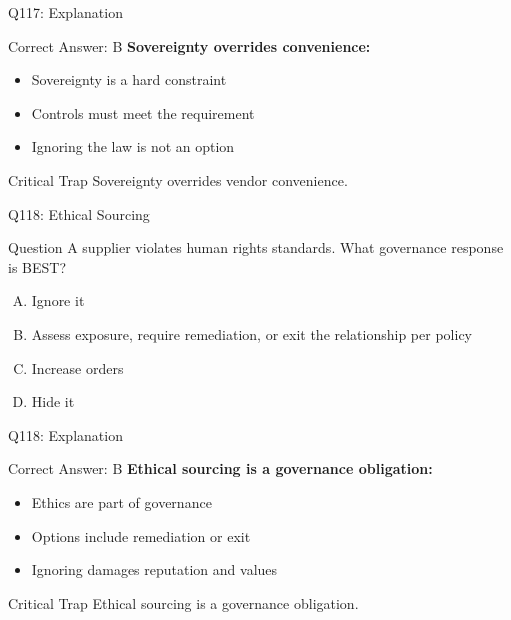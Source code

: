 \documentclass{beamer}
\begin{document}
	\begin{frame}{Q117: Explanation}
		\begin{block}{Correct Answer: B}
			\textbf{Sovereignty overrides convenience:}
			\begin{itemize}
				\item Sovereignty is a hard constraint
				\item Controls must meet the requirement
				\item Ignoring the law is not an option
			\end{itemize}
		\end{block}
		\begin{alertblock}{Critical Trap}
			Sovereignty overrides vendor convenience.
		\end{alertblock}
	\end{frame}
	
	\begin{frame}{Q118: Ethical Sourcing}
		\begin{block}{Question}
			A supplier violates human rights standards. What governance response is BEST?
		\end{block}
		\begin{enumerate}[(A)]
			\item Ignore it
			\item Assess exposure, require remediation, or exit the relationship per policy
			\item Increase orders
			\item Hide it
		\end{enumerate}
	\end{frame}
	
	\begin{frame}{Q118: Explanation}
		\begin{block}{Correct Answer: B}
			\textbf{Ethical sourcing is a governance obligation:}
			\begin{itemize}
				\item Ethics are part of governance
				\item Options include remediation or exit
				\item Ignoring damages reputation and values
			\end{itemize}
		\end{block}
		\begin{alertblock}{Critical Trap}
			Ethical sourcing is a governance obligation.
		\end{alertblock}
	\end{frame}
	
\end{document}
